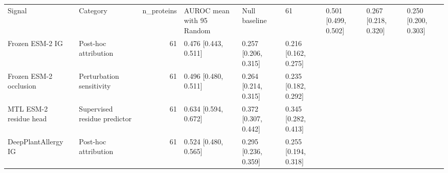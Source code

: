 \begin{tabular}{llrlll}
\toprule
Signal & Category & n_proteins & AUROC mean with 95%
\midrule
Random & Null baseline & 61 & 0.501 [0.499, 0.502] & 0.267 [0.218, 0.320] & 0.250 [0.200, 0.303] \\
Frozen ESM-2 IG & Post-hoc attribution & 61 & 0.476 [0.443, 0.511] & 0.257 [0.206, 0.315] & 0.216 [0.162, 0.275] \\
Frozen ESM-2 occlusion & Perturbation sensitivity & 61 & 0.496 [0.480, 0.511] & 0.264 [0.214, 0.315] & 0.235 [0.182, 0.292] \\
MTL ESM-2 residue head & Supervised residue predictor & 61 & 0.634 [0.594, 0.672] & 0.372 [0.307, 0.442] & 0.345 [0.282, 0.413] \\
DeepPlantAllergy IG & Post-hoc attribution & 61 & 0.524 [0.480, 0.565] & 0.295 [0.236, 0.359] & 0.255 [0.194, 0.318] \\
\bottomrule
\end{tabular}
